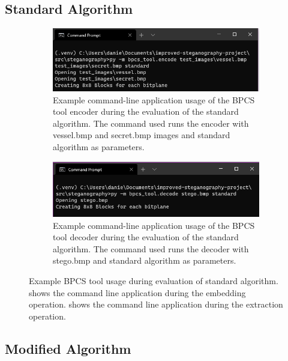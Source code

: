\documentclass{l4proj}
\begin{document}
\begin{appendices}
\subsection{Standard Algorithm}
\begin{figure}[!h]
    \centering
    \begin{subfigure}[b]{0.75\textwidth}
        \includegraphics[width=\textwidth]{images/evaluation_standardbpcs_terminal.png}
        \caption{Example command-line application usage of the BPCS tool encoder during the evaluation of the standard algorithm. The command used runs the encoder with vessel.bmp and secret.bmp images and standard algorithm as parameters.}
        \label{fig:standard_bpcs_encode_terminal}
    \end{subfigure}
    \begin{subfigure}[b]{0.75\textwidth}
        \includegraphics[width=\textwidth]{images/evaluation_standardbpcs_decode_terminal.png}
        \caption{Example command-line application usage of the BPCS tool decoder during the evaluation of the standard algorithm. The command used runs the decoder with stego.bmp and standard algorithm as parameters.}
        \label{fig:standard_bpcs_decoder_terminal}
    \end{subfigure}
    \caption{Example BPCS tool usage during evaluation of standard algorithm.  shows the command line application during the embedding operation.  shows the command line application during the extraction operation.}
\end{figure}

\subsection{Modified Algorithm}\label{modified_use}


\end{appendices}
\end{document}

